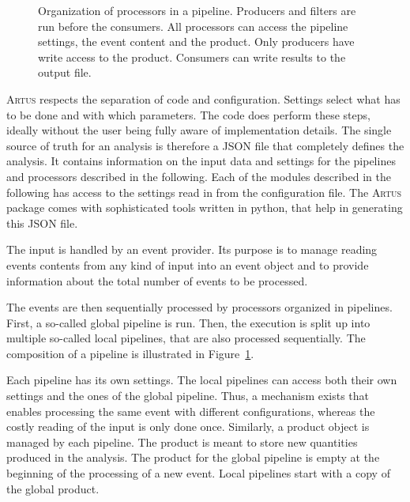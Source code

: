 \documentclass[3p]{elsarticle}
\newcommand{\software}[1]{\textsc{#1}\xspace}
\newcommand{\artus}{\software{Artus}}
\begin{document}
\begin{figure}[p]
\centering 
\caption[Structure of an \artus analysis.]{Structure of an \artus analysis.
The input is read by an event provider.
Within the pipelines the event content is analyzed by the processors.
Consumers in local pipelines write results to a common output.
All parts of the analysis are configurable.}
\label{figure_artus_structure}

\vspace{10ex}

\centering 
\caption[Organization of processors in a pipeline.]{Organization of processors in a pipeline.
Producers and filters are run before the consumers.
All processors can access the pipeline settings, the event content and the product.
Only producers have write access to the product.
Consumers can write results to the output file.}
\label{figure_artus_pipeline}
\end{figure}

\artus respects the separation of code and configuration.
Settings select what has to be done and with which parameters.
The code does perform these steps, ideally without the user being fully aware of implementation details.
The single source of truth for an analysis is therefore a JSON file that completely defines the analysis.
It contains information on the input data and settings for the pipelines and processors described in the following.
Each of the modules described in the following has access to the settings read in from the configuration file.
The \artus package comes with sophisticated tools written in python, that help in generating this JSON file.

The input is handled by an event provider.
Its purpose is to manage reading events contents from any kind of input into an event object and to provide information about the total number of events to be processed.

The events are then sequentially processed by processors organized in pipelines.
First, a so-called global pipeline is run.
Then, the execution is split up into multiple so-called local pipelines, that are also processed sequentially.
The composition of a pipeline is illustrated in Figure~\ref{figure_artus_pipeline}.

Each pipeline has its own settings.
The local pipelines can access both their own settings and the ones of the global pipeline.
Thus, a mechanism exists that enables processing the same event with different configurations, whereas the costly reading of the input is only done once.
Similarly, a product object is managed by each pipeline.
The product is meant to store new quantities produced in the analysis.
The product for the global pipeline is empty at the beginning of the processing of a new event.
Local pipelines start with a copy of the global product.
\end{document}
